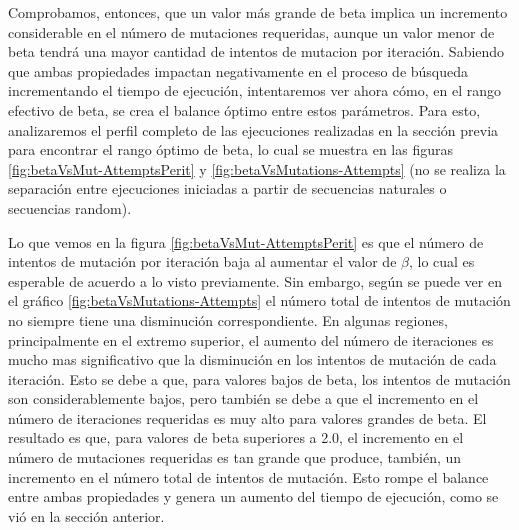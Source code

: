 Comprobamos, entonces, que un valor más grande de beta implica un incremento considerable en el número de mutaciones requeridas, aunque un valor menor de beta tendrá una mayor cantidad de intentos de mutacion por iteración.
Sabiendo que ambas propiedades impactan negativamente en el proceso de búsqueda incrementando el tiempo de ejecución, 
intentaremos ver ahora cómo, en el rango efectivo de beta, se crea el balance óptimo entre estos parámetros.
Para esto, analizaremos el perfil completo de las ejecuciones realizadas en la sección previa para encontrar el rango óptimo de beta, 
lo cual se muestra en las figuras \ref{fig:betaVsMut-AttemptsPerit} y \ref{fig:betaVsMutations-Attempts} (no se realiza la separación entre ejecuciones iniciadas a partir de secuencias naturales o secuencias random).

Lo que vemos en la figura \ref{fig:betaVsMut-AttemptsPerit} es que el número de intentos de mutación por iteración baja al aumentar el valor de $\beta$, lo cual es esperable de acuerdo a lo visto previamente.
Sin embargo, según se puede ver en el gráfico \ref{fig:betaVsMutations-Attempts} el número total de intentos de mutación no siempre tiene una disminución correspondiente.
En algunas regiones, principalmente en el extremo superior, el aumento del número de iteraciones es mucho mas significativo que la disminución en los intentos de mutación de cada iteración.
Esto se debe a que, para valores bajos de beta, los intentos de mutación son considerablemente bajos, pero también se debe a que el incremento en el número de iteraciones requeridas es muy alto para valores grandes de beta.
El resultado es que, para valores de beta superiores a 2.0, el incremento en el número de mutaciones requeridas es tan grande que produce, también, un incremento en el número total de intentos de mutación.
Esto rompe el balance entre ambas propiedades y genera un aumento del tiempo de ejecución, como se vió en la sección anterior.

